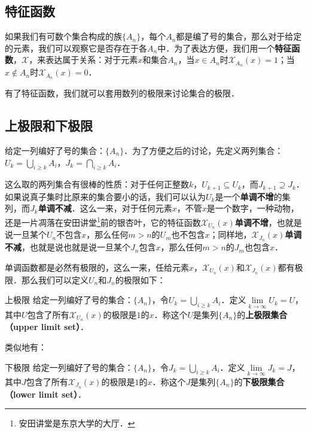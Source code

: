 

\subsection{特征函数}
如果我们有可数个集合构成的族$\{A_n\}$，每个$A_n$都是编了号的集合，那么对于给定的元素，我们可以观察它是否存在于各$A_n$中．为了表达方便，我们用一个\textbf{特征函数}，$\mathcal{X}$，来表达属于关系：对于元素$x$和集合$A_n$，当$x\in A_n$时$\mathcal{X}_{A_n}(x)=1$；当$x\not\in A_n$时$\mathcal{X}_{A_n}(x)=0$．

有了特征函数，我们就可以套用数列的极限来讨论集合的极限．

\subsection{上极限和下极限}
给定一列编好了号的集合：$\{A_n\}$．为了方便之后的讨论，先定义两列集合：$U_k=\bigcup_{i\ge k}A_i$，$J_k=\bigcap_{i\ge k}A_i$．

这么取的两列集合有很棒的性质：对于任何正整数$k$，$U_{k+1}\subseteq U_k$，而$J_{k+1}\supseteq J_k$．如果说真子集时比原来的集合要小的话，我们可以认为$U_k$是一个\textbf{单调不增}的集列，而$J_k$\textbf{单调不减}．这么一来，对于任何元素$x$，不管$x$是一个数字，一种动物，还是一片凋落在安田讲堂\footnote{安田讲堂是东京大学的大厅．}前的银杏叶，它的特征函数$\mathcal{X}_{U_n}(x)$\textbf{单调不增}，也就是说一旦某个$U_n$不包含$x$，那么任何$m>n$的$U_m$也不包含$x$；同样地，$\mathcal{X}_{J_n}(x)$\textbf{单调不减}，也就是说也就是说一旦某个$J_n$包含$x$，那么任何$m>n$的$J_m$也包含$x$．

单调函数都是必然有极限的，这么一来，任给元素$x$，$\mathcal{X}_{U_n}(x)$和$\mathcal{X}_{J_n}(x)$都有极限．那么我们可以定义$U_n$和$J_n$的极限如下：

\begin{definition}{上极限}
给定一列编好了号的集合：$\{A_n\}$，令$U_k=\bigcup_{i\ge k}A_i$．定义$\lim\limits_{k\rightarrow\infty} U_k=U$，其中$U$包含了所有$\mathcal{X}_{U_n}(x)$的极限是$1$的$x$．称这个$U$是集列$\{A_n\}$的\textbf{上极限集合（upper limit set）}．
\end{definition}

类似地有：

\begin{definition}{下极限}
给定一列编好了号的集合：$\{A_n\}$，令$J_k=\bigcup_{i\ge k}A_i$．定义$\lim\limits_{k\rightarrow\infty} J_k=J$，其中$J$包含了所有$\mathcal{X}_{J_n}(x)$的极限是$1$的$x$．称这个$J$是集列$\{A_n\}$的\textbf{下极限集合（lower limit set）}．
\end{definition}

